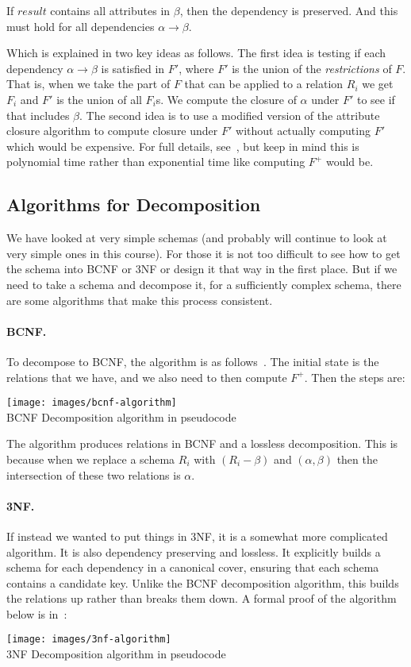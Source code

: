 If $result$ contains all attributes in $\beta$, then the dependency is preserved. And this must hold for all dependencies $\alpha \rightarrow \beta$.

Which is explained in two key ideas as follows. The first idea is testing if each dependency $\alpha \rightarrow \beta$ is satisfied in $F'$, where $F'$ is the union of the \textit{restrictions} of $F$. That is, when we take the part of $F$ that can be applied to a relation $R_{i}$ we get $F_{i}$ and $F'$ is the union of all $F_{i}$s. We compute the closure of $\alpha$ under $F'$ to see if that includes $\beta$. The second idea is to use a modified version of the attribute closure algorithm to compute closure under $F'$ without actually computing $F'$ which would be expensive. For full details, see~\cite{dsc}, but keep in mind this is polynomial time rather than exponential time like computing $F^{+}$ would be.

\subsection*{Algorithms for Decomposition}

We have looked at very simple schemas (and probably will continue to look at very simple ones in this course). For those it is not too difficult to see how to get the schema into BCNF or 3NF or design it that way in the first place. But if we need to take a schema and decompose it, for a sufficiently complex schema, there are some algorithms that make this process consistent.

\paragraph{BCNF.}To decompose to BCNF, the algorithm is as follows~\cite{dsc}. The initial state is the relations that we have, and we also need to then compute $F^{+}$. Then the steps are:

\begin{center}
\texttt{[image: images/bcnf-algorithm]}\\
BCNF Decomposition algorithm in pseudocode~\cite{dsc}
\end{center}

The algorithm produces relations in BCNF and a lossless decomposition. This is because when we replace a schema $R_{i}$ with $(R_{i} - \beta)$ and $(\alpha, \beta)$ then the intersection of these two relations is $\alpha$.

\paragraph{3NF.} If instead we wanted to put things in 3NF, it is a somewhat more complicated algorithm. It is also dependency preserving and lossless. It explicitly builds a schema for each dependency in a canonical cover, ensuring that each schema contains a candidate key. Unlike the BCNF decomposition algorithm, this builds the relations up rather than breaks them down. A formal proof of the algorithm below is in~\cite{dsc}: 

\begin{center}
\texttt{[image: images/3nf-algorithm]}\\
3NF Decomposition algorithm in pseudocode~\cite{dsc}
\end{center}




